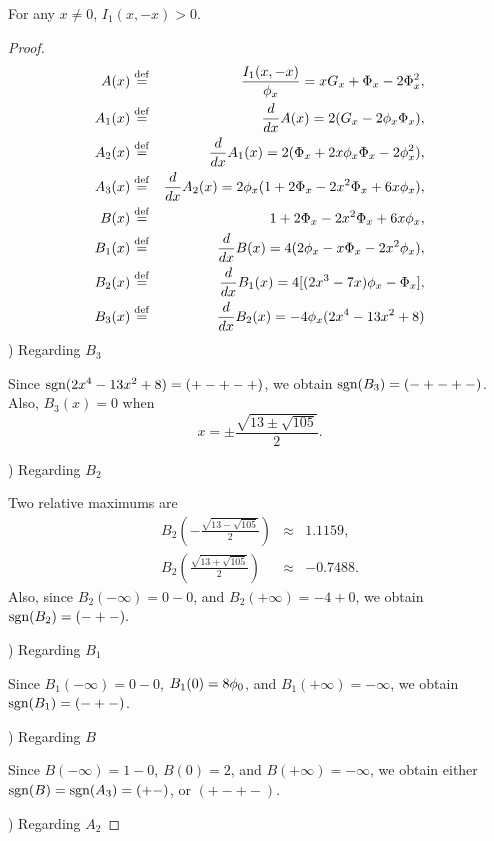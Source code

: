 \begin{lemma}\label{lem_l5}
 \quad For any $x \neq 0$, $I_1(x,-x)>0.$
\end{lemma}
\begin{proof}
\begin{eqnarray*}
  A(x) & \stackrel{\mathrm{def}}{=} & \frac{I_1(x,-x)}{\phi_x} = x G_x + \Phi_x - 2 \Phi_x^2, \\ 
  A_1(x) & \stackrel{\mathrm{def}}{=} & \frac{d }{d x}A(x) = 2 (G_x - 2\phi_x \Phi_x), \\
  A_2(x) & \stackrel{\mathrm{def}}{=} & \frac{d }{d x}A_1(x) = 2(\Phi_x + 2x \phi_x \Phi_x - 2\phi_x^2), \\
  A_3(x) & \stackrel{\mathrm{def}}{=} & \frac{d }{d x}A_2(x) = 2\phi_x (1+2\Phi_x-2x^2 \Phi_x + 6x \phi_x), \\
  B(x) & \stackrel{\mathrm{def}}{=} & 1+2\Phi_x-2x^2 \Phi_x + 6x \phi_x, \\
  B_1(x) & \stackrel{\mathrm{def}}{=} & \frac{d }{d x}B(x) = 4 ( 2 \phi_x - x\Phi_x - 2 x^2 \phi_x ), \\
  B_2(x) & \stackrel{\mathrm{def}}{=} & \frac{d }{d x}B_1(x) = 4 [(2x^3 - 7x) \phi_x - \Phi_x], \\
  B_3(x) & \stackrel{\mathrm{def}}{=} & \frac{d }{d x}B_2(x) = - 4 \phi_x (2x^4-13x^2+8)
\end{eqnarray*}
) Regarding $B_3$

Since $\mbox{sgn}(2x^4-13x^2+8)=(+-+-+)$, we obtain $\mbox{sgn}(B_3)=(-+-+-)$.  Also, $B_3(x)=0$ when
\[
 x = \pm \frac{\sqrt{13 \pm \sqrt{105}}}{2}.
\]

\smallskip

) Regarding $B_2$

Two relative maximums are
\begin{eqnarray*}
 B_2 \left( -\frac{\sqrt{13-\sqrt{105}}}{2} \right) & \approx & 1.1159, \\
 B_2 \left( \frac{\sqrt{13+\sqrt{105}}}{2} \right) & \approx & -0.7488.
\end{eqnarray*}
Also, since $B_2(-\infty) = 0-0$, and $B_2 (+\infty) = -4+0$, we obtain $\mbox{sgn}(B_2)=(-+-).$

\smallskip

) Regarding $B_1$

Since $B_1(-\infty) = 0-0$, $B_1(0) = 8 \p0$, and $B_1(+\infty) = - \infty$, we obtain $\mbox{sgn}(B_1)=(-+-)$.

\smallskip

) Regarding $B$

Since $B(-\infty) = 1-0$, $B(0) = 2$, and $B(+\infty) = -\infty$, we obtain either $\mbox{sgn}(B)=\mbox{sgn}(A_3)=(+-)$, or $(+-+-)$.

\smallskip

) Regarding $A_2$


\end{proof}
